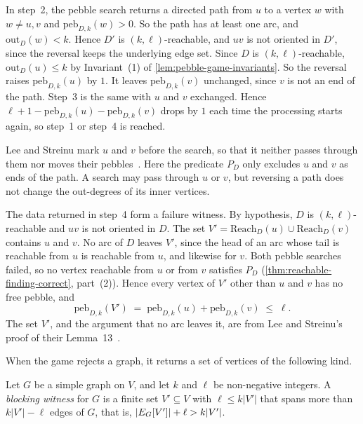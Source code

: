In step~2, the pebble search returns a directed path from $u$ to a
vertex $w$ with $w \ne u, v$ and $\mathrm{peb}_{D, k}(w) > 0$. So the
path has at least one arc, and $\mathrm{out}_D(w) < k$. Hence $D'$ is
$(k, \ell)$-reachable, and $uv$ is not oriented in $D'$, since the
reversal keeps the underlying edge set. Since $D$ is
$(k, \ell)$-reachable, $\mathrm{out}_D(u) \le k$ by Invariant~(1) of
\cref{lem:pebble-game-invariants}. So the reversal
raises $\mathrm{peb}_{D, k}(u)$ by $1$. It leaves
$\mathrm{peb}_{D, k}(v)$ unchanged, since $v$ is not an end of the
path. Step~3 is the same with $u$ and $v$ exchanged. Hence
$\ell + 1 - \mathrm{peb}_{D, k}(u) - \mathrm{peb}_{D, k}(v)$ drops by
$1$ each time the processing starts again, so step~1 or step~4 is
reached.

Lee and Streinu mark $u$ and $v$ before the search, so that it neither
passes through them nor moves their
pebbles~\cite[\S 3, Fig.~4]{leeStreinu2008}. Here the predicate $P_D$
only excludes $u$ and $v$ as ends of the path. A search may pass
through $u$ or $v$, but reversing a path does not change the
out-degrees of its inner vertices.

The data returned in step~4 form a failure witness. By hypothesis, $D$
is $(k, \ell)$-reachable and $uv$ is not oriented in $D$. The set
$V' = \mathrm{Reach}_D(u) \cup \mathrm{Reach}_D(v)$ contains $u$ and
$v$. No arc of $D$ leaves $V'$, since the head of an arc whose tail is
reachable from $u$ is reachable from $u$, and likewise for $v$. Both
pebble searches failed, so no vertex reachable from $u$ or from $v$
satisfies $P_D$ (\cref{thm:reachable-finding-correct}, part~(2)).
Hence every vertex of $V'$ other than $u$ and $v$ has no free pebble,
and
\[
  \mathrm{peb}_{D, k}(V') \;=\; \mathrm{peb}_{D, k}(u) +
  \mathrm{peb}_{D, k}(v) \;\le\; \ell.
\]
The set $V'$, and the argument that no arc leaves it, are from Lee and
Streinu's proof of their Lemma~13~\cite{leeStreinu2008}.

When the game rejects a graph, it returns a set of vertices of the
following kind.

\begin{definition}
  \label{def:blockingWitness}
  \leanok
  Let $G$ be a simple graph on $V$, and let $k$ and $\ell$ be
  non-negative integers. A \emph{blocking witness} for $G$ is a finite
  set $V' \subseteq V$ with $\ell \le k|V'|$ that spans more than
  $k|V'| - \ell$ edges of $G$, that is,
  $|\edgesIn[G]{V'}| + \ell > k|V'|$.
\end{definition}

